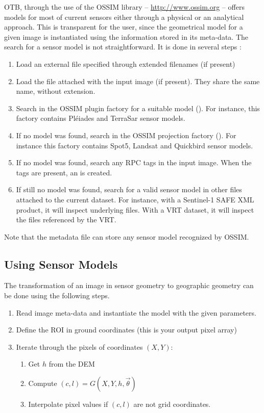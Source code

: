 OTB, through the use of the OSSIM library --
\url{http://www.ossim.org} -- offers models for most of current
sensors either through a physical or an analytical approach. This is
transparent for the user, since the geometrical model for a given
image is instantiated using the information stored in its meta-data. The 
search for a sensor model is not straightforward. It is done in several steps :
\begin{enumerate}
  \item Load an external  file specified through extended filenames
(if present)
  \item Load the  file attached with the input image (if present).
They share the same name, without extension.
  \item Search in the OSSIM plugin factory for a suitable model 
(). For instance, this
factory contains Pl\'eiades and TerraSar sensor models.
  \item If no model was found, search in the OSSIM projection factory 
(). For instance this factory contains
Spot5, Landsat and Quickbird sensor models.
  \item If no model was found, search any RPC tags in the input image. When the
tags are present, an  is created.
  \item If still no model was found, search for a valid sensor model in other
files attached to the current dataset. For instance, with a Sentinel-1 SAFE XML
product, it will inspect underlying  files. With a VRT dataset, it
will inspect the files referenced by the VRT.
\end{enumerate}

Note that the  metadata file can store any sensor model recognized
by OSSIM.

\subsection{Using Sensor Models}
\label{sec:UsingSensorModels}

The transformation of an image in sensor geometry to geographic
geometry can be done using the following steps.
  \begin{enumerate}
    \item Read image meta-data and instantiate the model with the
    given parameters.
  \item Define the ROI in ground coordinates (this is your output
  pixel array)
  \item Iterate through the pixels of coordinates $(X,Y)$:
    \begin{enumerate}
      \item Get $h$ from the DEM
      \item Compute $(c,l) = G(X,Y,h,\vec\theta)$
      \item Interpolate pixel values if $(c,l)$ are not grid coordinates.
    \end{enumerate}
  \end{enumerate}

